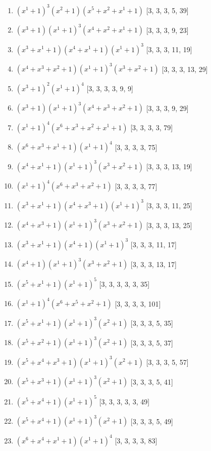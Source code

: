 \documentclass[10pt,twocolumn]{article}
\begin{document}
\begin{enumerate}
\item $(x^{1} + 1)^{3}(x^{2} + 1)(x^{5} + x^{2} + x^{1} + 1)$  [3, 3, 3, 5, 39]
\item $(x^{3} + 1)(x^{1} + 1)^{3}(x^{4} + x^{2} + x^{1} + 1)$  [3, 3, 3, 9, 23]
\item $(x^{3} + x^{1} + 1)(x^{4} + x^{1} + 1)(x^{1} + 1)^{3}$  [3, 3, 3, 11, 19]
\item $(x^{4} + x^{3} + x^{2} + 1)(x^{1} + 1)^{3}(x^{3} + x^{2} + 1)$  [3, 3, 3, 13, 29]
\item $(x^{3} + 1)^{2}(x^{1} + 1)^{4}$  [3, 3, 3, 3, 9, 9]
\item $(x^{3} + 1)(x^{1} + 1)^{3}(x^{4} + x^{3} + x^{2} + 1)$  [3, 3, 3, 9, 29]
\item $(x^{1} + 1)^{4}(x^{6} + x^{3} + x^{2} + x^{1} + 1)$  [3, 3, 3, 3, 79]
\item $(x^{6} + x^{3} + x^{1} + 1)(x^{1} + 1)^{4}$  [3, 3, 3, 3, 75]
\item $(x^{4} + x^{1} + 1)(x^{1} + 1)^{3}(x^{3} + x^{2} + 1)$  [3, 3, 3, 13, 19]
\item $(x^{1} + 1)^{4}(x^{6} + x^{3} + x^{2} + 1)$  [3, 3, 3, 3, 77]
\item $(x^{3} + x^{1} + 1)(x^{4} + x^{3} + 1)(x^{1} + 1)^{3}$  [3, 3, 3, 11, 25]
\item $(x^{4} + x^{3} + 1)(x^{1} + 1)^{3}(x^{3} + x^{2} + 1)$  [3, 3, 3, 13, 25]
\item $(x^{3} + x^{1} + 1)(x^{4} + 1)(x^{1} + 1)^{3}$  [3, 3, 3, 11, 17]
\item $(x^{4} + 1)(x^{1} + 1)^{3}(x^{3} + x^{2} + 1)$  [3, 3, 3, 13, 17]
\item $(x^{5} + x^{1} + 1)(x^{1} + 1)^{5}$  [3, 3, 3, 3, 3, 35]
\item $(x^{1} + 1)^{4}(x^{6} + x^{5} + x^{2} + 1)$  [3, 3, 3, 3, 101]
\item $(x^{5} + x^{1} + 1)(x^{1} + 1)^{3}(x^{2} + 1)$  [3, 3, 3, 5, 35]
\item $(x^{5} + x^{2} + 1)(x^{1} + 1)^{3}(x^{2} + 1)$  [3, 3, 3, 5, 37]
\item $(x^{5} + x^{4} + x^{3} + 1)(x^{1} + 1)^{3}(x^{2} + 1)$  [3, 3, 3, 5, 57]
\item $(x^{5} + x^{3} + 1)(x^{1} + 1)^{3}(x^{2} + 1)$  [3, 3, 3, 5, 41]
\item $(x^{5} + x^{4} + 1)(x^{1} + 1)^{5}$  [3, 3, 3, 3, 3, 49]
\item $(x^{5} + x^{4} + 1)(x^{1} + 1)^{3}(x^{2} + 1)$  [3, 3, 3, 5, 49]
\item $(x^{6} + x^{4} + x^{1} + 1)(x^{1} + 1)^{4}$  [3, 3, 3, 3, 83]

\end{enumerate}
\end{document}
